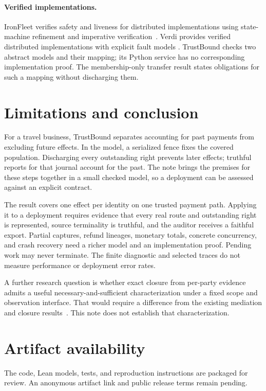 \documentclass[letterpaper]{article}
\begin{document}
\paragraph{Verified implementations.}
IronFleet verifies safety and liveness for distributed implementations using
state-machine refinement and imperative verification~\citep{ironfleet2015}.
Verdi provides verified distributed implementations with explicit fault models
\citep{verdi2015}. TrustBound checks two abstract models and their mapping; its
Python service has no corresponding implementation proof. The membership-only
transfer result states obligations for such a mapping without discharging them.

\section{Limitations and conclusion}
For a travel business, TrustBound separates accounting for past payments from
excluding future effects. In the model, a serialized fence fixes the covered
population. Discharging every outstanding right prevents later effects;
truthful reports for that journal account for the past. The note brings the
premises for these steps together in a small checked model, so a deployment
can be assessed against an explicit contract.

The result covers one effect per identity on one trusted payment path.
Applying it to a deployment requires evidence that every real route and
outstanding right is represented, source terminality is truthful, and the
auditor receives a faithful export. Partial captures, refund lineages, monetary totals, concrete concurrency, and crash
recovery need a richer model and an implementation proof. Pending work may
never terminate. The finite diagnostic and selected traces do not measure
performance or deployment error rates.

A further research question is whether exact closure from per-party evidence
admits a useful necessary-and-sufficient characterization under a fixed scope
and observation interface. That would require a difference from the existing
mediation and closure results~\citep{salas,budget,effectbound}. This note does not
establish that characterization.

\appendix
\section{Artifact availability}
\label{app:artifact}
The code, Lean models, tests, and reproduction instructions are packaged for
review. An anonymous artifact link and public release terms remain pending.
\end{document}
